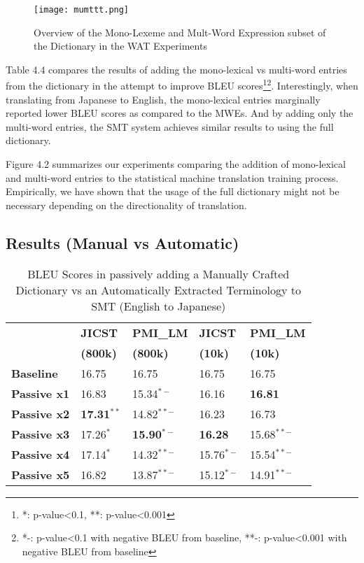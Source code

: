 \begin{figure}[H]
\centering
	\hspace{-2em}%
	\texttt{[image: mumttt.png]} \\[-1em]
	\caption{Overview of the Mono-Lexeme and Mult-Word Expression subset of the Dictionary in the WAT Experiments}
	\label{fig-mumttt}
\end{figure}
\vspace{-5mm}

Table 4.4 compares the results of adding the mono-lexical vs multi-word entries from the dictionary in the attempt to improve BLEU scores\footnote{*: p-value<0.1, **: p-value<0.001}\footnote{*-: p-value<0.1 with negative BLEU from baseline, **-: p-value<0.001 with negative BLEU from baseline}. Interestingly, when translating from Japanese to English, the mono-lexical entries marginally reported lower BLEU scores as compared to the MWEs. And by adding only the multi-word entries, the SMT system achieves similar results to using the full dictionary.

Figure 4.2 summarizes our experiments comparing the addition of mono-lexical and multi-word entries to the statistical machine translation training process. Empirically, we have shown that the usage of the full dictionary might not be necessary depending on the directionality of translation.

\subsection{Results (Manual vs Automatic)}

\begin{table}[H]
\centering
    \begin{tabular}{l|ll|ll}
               & \textbf{JICST} & \textbf{PMI\_LM} & \textbf{JICST} & \textbf{PMI\_LM }  \\ 
                & \textbf{(800k)} & \textbf{(800k)} & \textbf{(10k)} & \textbf{(10k)}  \\ \hline
\textbf{Baseline}  & 16.75 & 16.75 & 16.75 & 16.75 \\ \hline           
                
    \textbf{Passive x1} & 16.83        & 15.34$^{*-}$          & 16.16       & \textbf{16.81}         \\
    \textbf{Passive x2} & \textbf{17.31$^{**}$ }       & 14.82$^{**-}$          & 16.23       & 16.73   \\
    \textbf{Passive x3} & 17.26$^{*}$        & \textbf{15.90$^{*-}$}          & \textbf{16.28}       & 15.68$^{**-}$    \\
   \textbf{Passive x4} & 17.14$^{*}$        & 14.32$^{**-}$          & 15.76$^{*-}$       & 15.54$^{**-}$    \\
    \textbf{Passive x5} & 16.82        & 13.87$^{**-}$          & 15.12$^{*-}$       & 14.91$^{**-}$       
    \end{tabular}
    \caption{BLEU Scores in passively adding a Manually Crafted Dictionary vs an Automatically Extracted Terminology to SMT (English to Japanese)}
\label{table:watlmpmienja}
\end{table}


